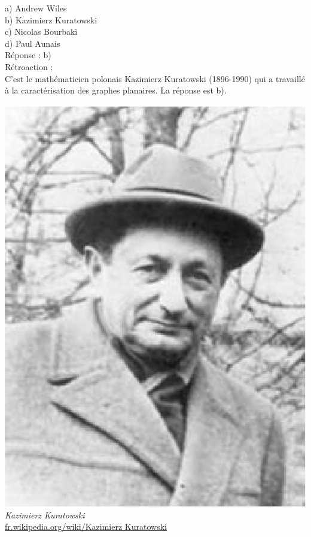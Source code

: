 \documentclass[letterpaper, 12pt]{article}
\begin{document}
a) Andrew Wiles \\
b) Kazimierz Kuratowski\\
c) Nicolas Bourbaki\\
d) Paul Aunais\\

R\'eponse : b)\\

R\'etroaction :\\
C'est le math\'ematicien polonais Kazimierz Kuratowski (1896-1990) qui a travaill\'e \`a la caract\'erisation des graphes planaires. La r\'eponse est b).
\begin{center}
\includegraphics[scale=0.45]{Kuratowski.eps}\\
\emph{{\small Kazimierz Kuratowski}}\\
\href{http://fr.wikipedia.org/wiki/Kazimierz_Kuratowski}{fr.wikipedia.org/wiki/Kazimierz Kuratowski}\\[5mm]
\end{center}
\end{document}
